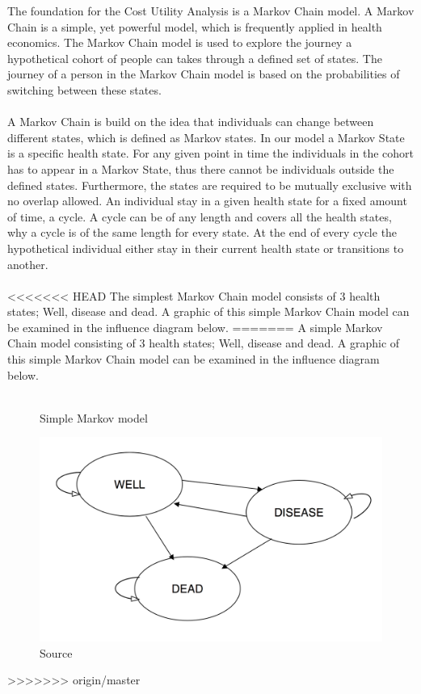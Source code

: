 \documentclass[a4paper,12pt]{article}
\begin{document}
The foundation for the Cost Utility Analysis is a Markov Chain model. A Markov Chain is a simple, yet powerful model, which is frequently applied in health economics. The Markov Chain model is used to explore the journey a hypothetical cohort of people can takes through a defined set of states. The journey of a person in the Markov Chain model is based on the probabilities of switching between these states.
\\\\
A Markov Chain is build on the idea that individuals can change between different states, which is defined as Markov states. In our model a Markov State is a specific health state. For any given point in time the individuals in the cohort has to appear in a Markov State, thus there cannot be individuals outside the defined states. Furthermore, the states are required to be mutually exclusive with no overlap allowed. An individual stay in a given health state for a fixed amount of time, a cycle. A cycle can be of any length and covers all the health states, why a cycle is of the same length for every state. At the end of every cycle the hypothetical individual either stay in their current health state or transitions to another.
\\\\
<<<<<<< HEAD
The simplest Markov Chain model consists of 3 health states; Well, disease and dead. A graphic of this simple Markov Chain model can be examined in the influence diagram below.
=======
A simple Markov Chain model consisting of 3 health states; Well, disease and dead. A graphic of this simple Markov Chain model can be examined in the influence diagram below.
\\\\
\begin{figure}[h]
	\centering
	\caption[]{Simple Markov model}
	\label{fig:markov-simple}
	\includegraphics[width=0.7\linewidth]{"Pictures/Markov simple"}
	\caption*{Source}
\end{figure}
>>>>>>> origin/master
\end{document}
